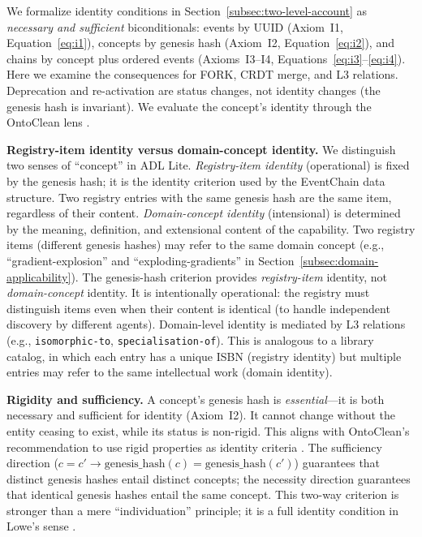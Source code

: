 We formalize identity conditions in Section~\ref{subsec:two-level-account} as \emph{necessary and sufficient} biconditionals: events by UUID (Axiom~I1, Equation~\ref{eq:i1}), concepts by genesis hash (Axiom~I2, Equation~\ref{eq:i2}), and chains by concept plus ordered events (Axioms~I3--I4, Equations~\ref{eq:i3}--\ref{eq:i4}). Here we examine the consequences for FORK, CRDT merge, and L3 relations. Deprecation and re-activation are status changes, not identity changes (the genesis hash is invariant). We evaluate the concept's identity through the OntoClean lens \cite{ontoclean}.

\textbf{Registry-item identity versus domain-concept identity.} We distinguish two senses of ``concept'' in ADL Lite. \emph{Registry-item identity} (operational) is fixed by the genesis hash; it is the identity criterion used by the EventChain data structure. Two registry entries with the same genesis hash are the same item, regardless of their content. \emph{Domain-concept identity} (intensional) is determined by the meaning, definition, and extensional content of the capability. Two registry items (different genesis hashes) may refer to the same domain concept (e.g., ``gradient-explosion'' and ``exploding-gradients'' in Section~\ref{subsec:domain-applicability}). The genesis-hash criterion provides \emph{registry-item} identity, not \emph{domain-concept} identity. It is intentionally operational: the registry must distinguish items even when their content is identical (to handle independent discovery by different agents). Domain-level identity is mediated by L3 relations (e.g., \texttt{isomorphic-to}, \texttt{specialisation-of}). This is analogous to a library catalog, in which each entry has a unique ISBN (registry identity) but multiple entries may refer to the same intellectual work (domain identity).

\textbf{Rigidity and sufficiency.} A concept's genesis hash is \emph{essential}---it is both necessary and sufficient for identity (Axiom~I2). It cannot change without the entity ceasing to exist, while its status is non-rigid. This aligns with OntoClean's recommendation to use rigid properties as identity criteria \cite{ontoclean}. The sufficiency direction ($c = c' \rightarrow \text{genesis\_hash}(c) = \text{genesis\_hash}(c')$) guarantees that distinct genesis hashes entail distinct concepts; the necessity direction guarantees that identical genesis hashes entail the same concept. This two-way criterion is stronger than a mere ``individuation'' principle; it is a full identity condition in Lowe's sense \cite{lowe1998possibility}.


